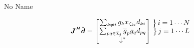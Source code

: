 \documentclass[a4paper,10pt]{article}
\newcommand{\conj}[1]{\overline{#1}}
\newcommand\coolover[2]{\mathrlap{\smash{\overbrace{\phantom{%
    \begin{matrix} #2 \end{matrix}}}^{\mbox{$#1$}}}}#2}
\newcommand\coolunder[2]{\mathrlap{\smash{\underbrace{\phantom{%
    \begin{matrix} #2 \end{matrix}}}_{\mbox{$#1$}}}}#2}
\newcommand\coolleftbrace[2]{%
#1\left\{\vphantom{\begin{matrix} #2 \end{matrix}}\right.}
\newcommand\coolrightbrace[2]{%
\left.\vphantom{\begin{matrix} #1 \end{matrix}}\right\}#2}
\begin{document}
\begin{section}{No Name}

\begin{equation}
\boldsymbol{J}^H\breve{\boldsymbol{d}} = 
\begin{bmatrix}
\sum_{k\neq i } g_k x_{\zeta_{ki}}d_{ki}\\
\sum_{pq \in \mathcal{I}_j} \conj{g}_p g_q d_{pq}\\
\downarrow^{*}
\end{bmatrix}
\begin{matrix}%
\coolrightbrace{\sum g_k x_{\zeta_{ki}}d_{ki}}{i = 1\cdots N}\\
\coolrightbrace{\sum \conj{g}_p g_q d_{pq}}{j = 1\cdots L}\\
\vphantom{\downarrow^{*}}
\end{matrix}
\end{equation}


\end{section}
\end{document}

